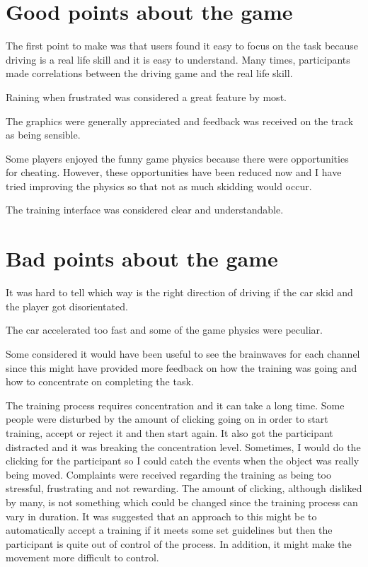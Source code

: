 \section{Good points about the game}
The first point to make was that users found it easy to focus on the task because driving is a real life skill and it is easy to understand. Many times, participants made correlations between the driving game and the real life skill.

Raining when frustrated was considered a great feature by most.

The graphics were generally appreciated and feedback was received on the track as being sensible. 

Some players enjoyed the funny game physics because there were opportunities for cheating. However, these opportunities have been reduced now and I have tried improving the physics so that not as much skidding would occur.

The training interface was considered clear and understandable.

\section{Bad points about the game}
It was hard to tell which way is the right direction of driving if the car skid and the player got disorientated.

The car accelerated too fast and some of the game physics were peculiar. 

Some considered it would have been useful to see the brainwaves for each channel since this might have provided more feedback on how the training was going and how to concentrate on completing the task.

The training process requires concentration and it can take a long time. Some people were disturbed by the amount of clicking going on in order to start training, accept or reject it and then start again. It also got the participant distracted and it was breaking the concentration level. Sometimes, I would do the clicking for the participant so I could catch the events when the object was really being moved. Complaints were received regarding the training as being too stressful, frustrating and not rewarding. The amount of clicking, although disliked by many, is not something which could be changed since the training process can vary in duration. It was suggested that an approach to this might be to automatically accept a training if it meets some set guidelines but then the participant is quite out of control of the process. In addition, it might make the movement more difficult to control.

